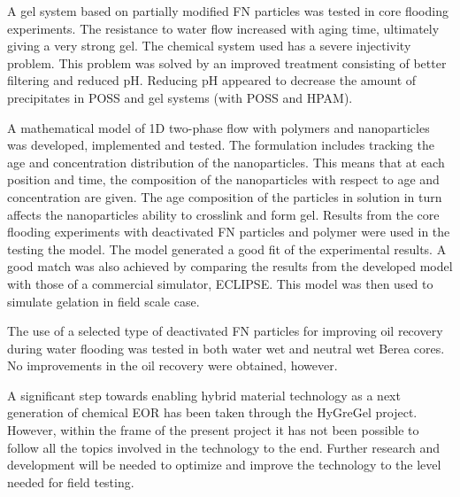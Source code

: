 A gel system based on partially modified FN particles was tested in core flooding experiments. The resistance to water flow increased with aging time, ultimately giving a very strong gel. The chemical system used has a severe injectivity problem. This problem was solved by an improved treatment consisting of better filtering and reduced pH. Reducing pH appeared to decrease the amount of precipitates in POSS and gel systems (with POSS and HPAM).    

A mathematical model of 1D two-phase flow with polymers and nanoparticles was developed, implemented and tested. The formulation includes tracking the age and concentration distribution of the nanoparticles. This means that at each position and time, the composition of the nanoparticles with respect to age and concentration are given. The age composition of the particles in solution in turn affects the nanoparticles ability to crosslink and form gel. Results from the core flooding experiments with deactivated FN particles and polymer were used in the testing the model. The model generated a good fit of the experimental results. A good match was also achieved by comparing the results from the developed model with those of a commercial simulator, ECLIPSE. This model was then used to simulate gelation in field scale case.

The use of a selected type of deactivated FN particles for improving oil recovery during water flooding was tested in both water wet and neutral wet Berea cores. No improvements in the oil recovery were obtained, however.

A significant step towards enabling hybrid material technology as a next generation of chemical EOR has been taken through the HyGreGel project. However, within the frame of the present project it has not been possible to follow all the topics involved in the technology to the end. Further research and development will be needed to optimize and improve the technology to the level needed for field testing.  
